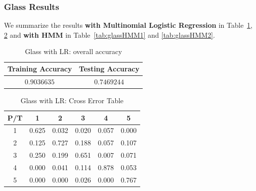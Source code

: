 \subsubsection{Glass Results}
\label{sec:glassresult}

We summarize the results \textbf{with Multinomial Logistic Regression} in Table~\ref{tab:glassLR1}, \ref{tab:glassLR2} and \textbf{with HMM} in Table~\ref{tab:glassHMM1} and \ref{tab:glassHMM2}.

\begin{table}[!htb]
\begin{center}
\begin{tabular}{c|c}
      \hline
      Training Accuracy & Testing Accuracy\\
      \hline
      $0.9036635$ & $0.7469244$ \\
      \hline
\end{tabular}
\caption{Glass with LR: overall accuracy}
\label{tab:glassLR1}
\end{center}
\end{table}

\begin{table}[!htb]
\begin{center}
\begin{tabular}{c|c|c|c|c|c}
      \hline
      P/T& 1 & 2 &3 & 4 & 5 \\
      \hline
      1 &0.625&0.032&0.020&0.057&0.000\\
      2 &0.125&0.727&0.188&0.057&0.107\\
      3 &0.250&0.199&0.651&0.007&0.071\\
      4 &0.000&0.041&0.114&0.878&0.053\\
      5 & 0.000&0.000&0.026&0.000&0.767\\
      \hline
\end{tabular}
\caption{Glass with LR: Cross Error Table}
\label{tab:glassLR2}
\end{center}
\end{table}

